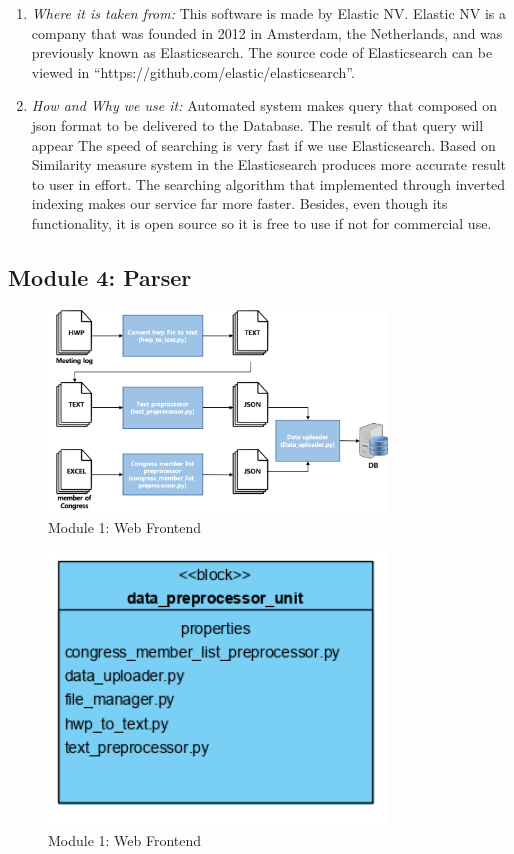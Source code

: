\documentclass[conference]{IEEEtran}
\begin{document}
\begin{enumerate}
\begin{enumerate}
		 \end{enumerate}

		  
	    \item \textit{Where it is taken from: } This software is made by Elastic NV. Elastic NV is a company that was founded in 2012 in Amsterdam, the Netherlands, and was previously known as Elasticsearch. The source code of Elasticsearch can be viewed in “https://github.com/elastic/elasticsearch”.\\
	    
  \item \textit{How and Why we use it: } Automated system makes query that composed on json format to be delivered to the Database. The result of that query will appear The speed of searching is very fast if we use Elasticsearch. Based on Similarity measure system in the Elasticsearch produces more accurate result to user in effort.  The searching algorithm that implemented through inverted indexing makes our service far more faster. Besides, even though its functionality, it is open source so it is free to use if not for commercial use.\\
  \end{enumerate}
  
  
  
  
  
  
    \subsection{Module 4: Parser}
\begin{figure}[htbp]
	\centerline{\includegraphics[width=90mm,scale=0.5]{fig/6_9.png}}
	\caption{Module 1: Web Frontend}
	\label{fig}
	\end{figure}
	
\begin{figure}[htbp]
	\centerline{\includegraphics[width=90mm,scale=0.5]{fig/6_10.png}}
	\caption{Module 1: Web Frontend}
	\label{fig}
	\end{figure}
	
\end{document}
